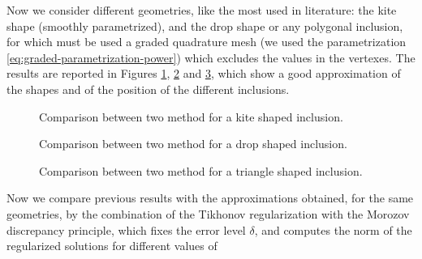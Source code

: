 \documentclass[10pt, a4paper, twoside, openright]{book}
\theoremstyle{definition}
\theoremstyle{plain}
\theoremstyle{plain}
\theoremstyle{plain}
\theoremstyle{plain}
\theoremstyle{plain}
\theoremstyle{plain}
\theoremstyle{plain}
\theoremstyle{plain}
\begin{document}
Now we consider different geometries, like the most used in literature: the kite shape (smoothly parametrized), 
and the drop shape or any polygonal inclusion, for which must be used a graded quadrature mesh 
(we used the parametrization \eqref{eq:graded-parametrization-power}) which excludes the values in the vertexes. 
The results are reported in Figures \ref{fig:first_compare_kite}, \ref{fig:first_compare_drop} 
and \ref{fig:first_compare_triangle}, which show a good approximation of the shapes and 
of the position of the different inclusions. 
\begin{center}
\begin{figure}[]%
\caption{Comparison between two method for a kite shaped inclusion.}
\label{fig:first_compare_kite}
\end{figure}
\end{center}
\begin{center}
\begin{figure}%
\caption{Comparison between two method for a drop shaped inclusion.}
\label{fig:first_compare_drop}
\end{figure}
\end{center}
\begin{center}
\begin{figure}%
\caption{Comparison between two method for a triangle shaped inclusion.}
\label{fig:first_compare_triangle}
\end{figure}
\end{center}
Now we compare previous results with the approximations obtained, for the same geometries, by the 
combination of the Tikhonov regularization with the Morozov discrepancy principle, which fixes the 
error level $\delta$, and computes the norm of the regularized solutions for different values of 
\end{document}
